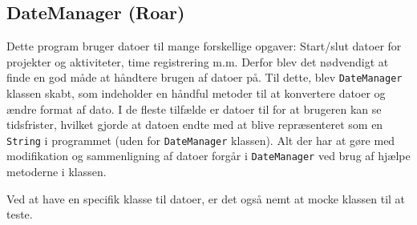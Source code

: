 \subsection{DateManager (Roar)}

Dette program bruger datoer til mange forskellige opgaver: Start/slut datoer for projekter og aktiviteter, time registrering m.m. Derfor blev det nødvendigt at finde en god måde at håndtere brugen af datoer på. Til dette, blev \texttt{DateManager} klassen skabt, som indeholder en håndful metoder til at konvertere datoer og ændre format af dato. I de fleste tilfælde er datoer til for at brugeren kan se tidsfrister, hvilket gjorde at datoen endte med at blive repræsenteret som en \texttt{String} i programmet (uden for \texttt{DateManager} klassen). Alt der har at gøre med modifikation og sammenligning af datoer forgår i \texttt{DateManager} ved brug af hjælpe metoderne i klassen.

Ved at have en specifik klasse til datoer, er det også nemt at mocke klassen til at teste.
